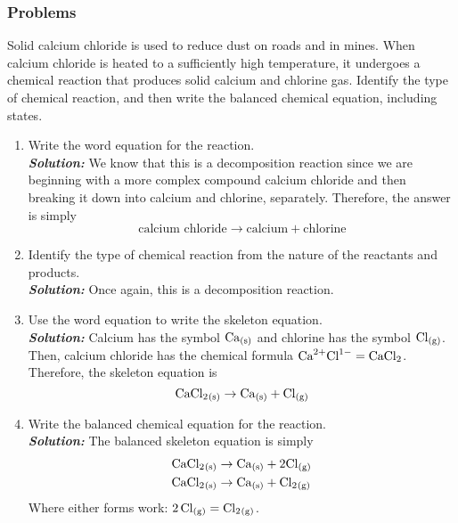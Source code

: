 \documentclass[12pt]{report}
\begin{document}
\subsubsection{Problems}
Solid calcium chloride is used to reduce dust on roads and in mines. When calcium chloride is heated to a sufficiently high temperature, it undergoes a chemical reaction that produces solid calcium and chlorine gas. Identify the type of chemical reaction, and then write the balanced chemical equation, including states.
\begin{enumerate}
\setlength\itemsep{1em}
\item{Write the word equation for the reaction.}\\

    \textit{ \textbf{Solution:}} We know that this is a decomposition reaction since we are beginning with a more complex compound calcium chloride and then breaking it down into calcium and chlorine, separately. Therefore, the answer is simply
    \[
        \text{calcium chloride}\to \text{calcium}+ \text{chlorine}
    \]

\item{Identify the type of chemical reaction from the nature of the reactants and products.}\\

    \textit{\textbf{Solution:}} Once again, this is a decomposition reaction.  

\item{Use the word equation to write the skeleton equation.}\\

    \textit{\textbf{Solution:}} Calcium has the symbol $ \ce{Ca_{(s)}}$ and chlorine has the symbol $ \ce{Cl_{(g)}}$. Then, calcium chloride has the chemical formula $ \text{Ca}^{2+} \text{Cl}^{1-}= \ce{CaCl2}$. Therefore, the skeleton equation is 
    \[
        \ce{CaCl2_{(s)}}\to \ce{Ca_{(s)}}+ \ce{Cl_{(g)}}
    \]

\item{Write the balanced chemical equation for the reaction.}\\

    \textit{\textbf{Solution:}} The balanced skeleton equation is simply 
    \begin{align*}
        \ce{CaCl2_{(s)}}&\to \ce{Ca_{(s)}}+ 2\ce{Cl_{(g)}}\\
        \ce{CaCl2_{(s)}}&\to \ce{Ca_{(s)}}+ \ce{Cl2_{(g)}}
    \end{align*}
    Where either forms work: $\ce{2Cl_{(g)}}= \ce{Cl2_{(g)}}$.


\end{enumerate}
\end{document}
